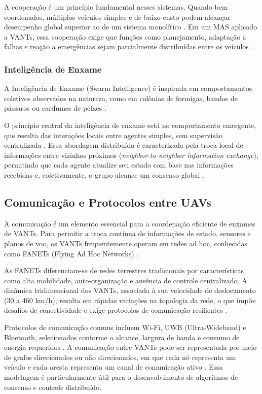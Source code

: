 \documentclass[portuguese]{sbcreviews-2025}%
\begin{document}
A cooperação é um princípio fundamental nesses sistemas. Quando bem coordenados, múltiplos veículos simples e de baixo custo podem alcançar desempenho global superior ao de um sistema monolítico \cite{ren2007consensus}. Em um MAS aplicado a VANTs, essa cooperação exige que funções como planejamento, adaptação a falhas e reação a emergências sejam parcialmente distribuídas entre os veículos \cite{dong2004behavior}.

\subsubsection{Inteligência de Enxame}

A Inteligência de Enxame (Swarm Intelligence) é inspirada em comportamentos coletivos observados na natureza, como em colônias de formigas, bandos de pássaros ou cardumes de peixes \cite{bu2024advancement, chung2018survey}.

O princípio central da inteligência de enxame está no comportamento emergente, que resulta das interações locais entre agentes simples, sem supervisão centralizada \cite{chung2018survey}. Essa abordagem distribuída é caracterizada pela troca local de informações entre vizinhos próximos (\textit{neighbor-to-neighbor information exchange}), permitindo que cada agente atualize seu estado com base nas informações recebidas e, coletivamente, o grupo alcance um consenso global \cite{ren2007consensus, bu2024advancement}.

\subsection{Comunicação e Protocolos entre UAVs}

A comunicação é um elemento essencial para a coordenação eficiente de enxames de VANTs. Para permitir a troca contínua de informações de estado, sensores e planos de voo, os VANTs frequentemente operam em redes ad hoc, conhecidas como FANETs (Flying Ad Hoc Networks) \cite{khan2017fanet, hong2020swarm}.

As FANETs diferenciam-se de redes terrestres tradicionais por características como alta mobilidade, auto-organização e ausência de controle centralizado. A dinâmica tridimensional dos VANTs, associada à sua velocidade de deslocamento (30 a 460 km/h), resulta em rápidas variações na topologia da rede, o que impõe desafios de conectividade e exige protocolos de comunicação resilientes \cite{khan2017fanet}.

Protocolos de comunicação comuns incluem Wi-Fi, UWB (Ultra-Wideband) e Bluetooth, selecionados conforme o alcance, largura de banda e consumo de energia requeridos \cite{chung2018survey}. A comunicação entre VANTs pode ser representada por meio de grafos direcionados ou não direcionados, em que cada nó representa um veículo e cada aresta representa um canal de comunicação ativo \cite{ren2007consensus}. Essa modelagem é particularmente útil para o desenvolvimento de algoritmos de consenso e controle distribuído.
\end{document}
